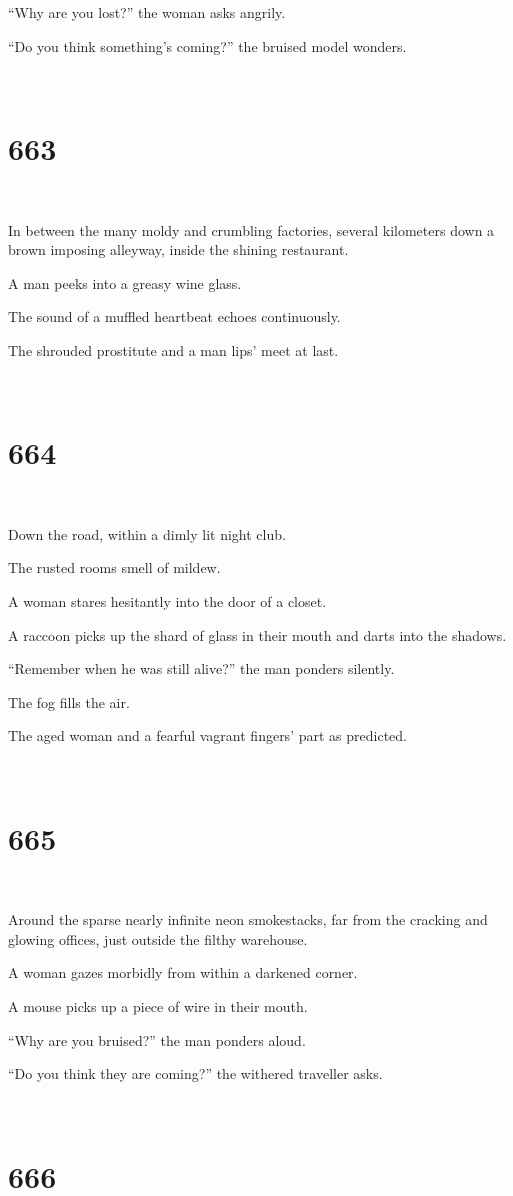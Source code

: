 \documentclass{report}
\begin{document}
``Why are you lost?'' the woman asks angrily.

``Do you think something's coming?'' the bruised model wonders.

~
\chapter*{663}
~

In between the many moldy and crumbling factories, several kilometers down a brown imposing alleyway, inside the shining restaurant.

A man peeks into a greasy wine glass.

The sound of a muffled heartbeat echoes continuously.

The shrouded prostitute and a man lips' meet at last.

~
\chapter*{664}
~

Down the road, within a dimly lit night club.

The rusted rooms smell of mildew.

A woman stares hesitantly into the door of a closet.

A raccoon picks up the shard of glass in their mouth and darts into the shadows.

``Remember when he was still alive?'' the man ponders silently.

The fog fills the air.

The aged woman and a fearful vagrant fingers' part as predicted.

~
\chapter*{665}
~

Around the sparse nearly infinite neon smokestacks, far from the cracking and glowing offices, just outside the filthy warehouse.

A woman gazes morbidly from within a darkened corner.

A mouse picks up a piece of wire in their mouth.

``Why are you bruised?'' the man ponders aloud.

``Do you think they are coming?'' the withered traveller asks.

~
\chapter*{666}
~
\end{document}
